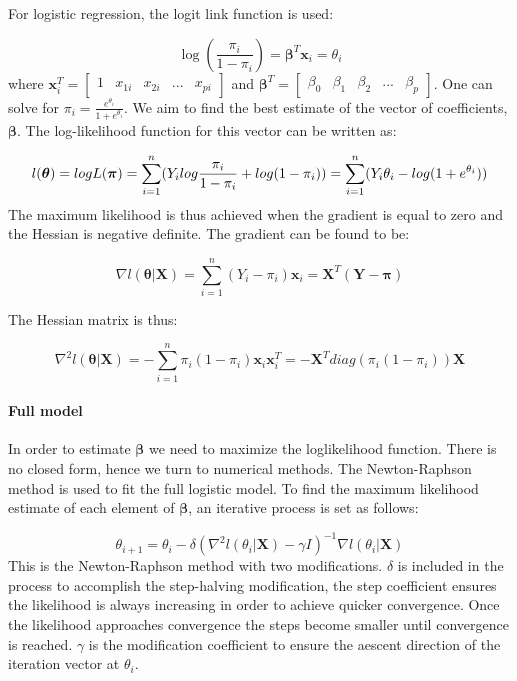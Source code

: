 \documentclass[]{article}
\let\oldparagraph\paragraph
\renewcommand{\paragraph}[1]{\oldparagraph{#1}\mbox{}}
\begin{document}
For logistic regression, the logit link function is used:

\[\log(\frac{\pi_i}{1-\pi_i}) = \boldsymbol \beta ^T\boldsymbol x_i = \theta_i\]
where
\(\boldsymbol x_i^T = \begin{bmatrix} 1 & x_{1i} &x_{2i} & ... & x_{pi} \end{bmatrix}\)
and
\(\boldsymbol \beta^T = \begin{bmatrix} \beta_0 & \beta_1 & \beta_2 & ... & \beta_p \end{bmatrix}\).
One can solve for \(\pi_i = \frac{e^{\theta_i}}{1 + e^{\theta_i}}\). We
aim to find the best estimate of the vector of coefficients,
\(\boldsymbol \beta\). The log-likelihood function for this vector can
be written as:

\[l(\boldsymbol\theta)=logL(\boldsymbol\pi) =\sum_{i=1}^n(Y_ilog\frac{\pi_i}{1-\pi_i}+log(1-\pi_i)) = \sum_{i=1}^n(Y_i\theta_i - log(1 + e^{\mathbf \theta_i}))\\\]
The maximum likelihood is thus achieved when the gradient is equal to
zero and the Hessian is negative definite. The gradient can be found to
be:

\[\nabla l(\boldsymbol\theta|\boldsymbol X) = \sum_{i=1}^n (Y_i - \pi_i)\boldsymbol x_i = \boldsymbol X^T(\boldsymbol Y - \boldsymbol \pi) \]

The Hessian matrix is thus:

\[\nabla^2 l(\boldsymbol\theta|\boldsymbol X) = -\sum_{i=1}^n \pi_i(1 - \pi_i)\boldsymbol x_i\boldsymbol x_i^T = -\boldsymbol X^Tdiag(\pi_i(1 - \pi_i)) \boldsymbol X\]

\hypertarget{full-model}{%
\paragraph{Full model}\label{full-model}}

In order to estimate \(\boldsymbol \beta\) we need to maximize the
loglikelihood function. There is no closed form, hence we turn to
numerical methods. The Newton-Raphson method is used to fit the full
logistic model. To find the maximum likelihood estimate of each element
of \(\boldsymbol \beta\), an iterative process is set as follows:

\[\theta_{i+1}  = \theta_{i} -\delta (\nabla^2l(\theta_{i}|\boldsymbol X)-\gamma I)^{-1}\nabla l(\theta_{i}|\boldsymbol X) \]
This is the Newton-Raphson method with two modifications. \(\delta\) is
included in the process to accomplish the step-halving modification, the
step coefficient ensures the likelihood is always increasing in order to
achieve quicker convergence. Once the likelihood approaches convergence
the steps become smaller until convergence is reached. \(\gamma\) is the
modification coefficient to ensure the aescent direction of the
iteration vector at \(\theta_{i}\).
\end{document}
